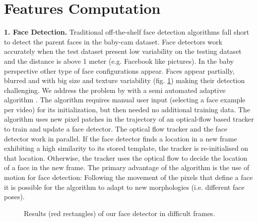 \documentclass[10pt,letterpaper]{article}
\begin{document}
\section{Features Computation}
{\bf 1. Face Detection.} Traditional off-the-shelf face detection algorithms fall short to detect the parent faces in the baby-cam dataset. Face detectors work accurately when the test dataset present low variability on the testing dataset and the distance is above 1 meter (e.g. Facebook like pictures). In the baby perspective other type of face configurations appear. Faces appear partially, blurred and with big size and texture variability (fig. \ref{fig:faces}) making their detection challenging. We address the problem by with a semi automated adaptive algorithm \cite{kalal}. The algorithm requires manual user input (selecting a face example per video) for its initialization, but then needed no additional training data. The algorithm uses new pixel patches in the trajectory of an optical-flow based tracker to train and update a face detector. The optical flow tracker and the face detector work in parallel. If the face detector finds a location in a new frame exhibiting a high similarity to its stored template, the tracker is re-initialised on that location. Otherwise, the tracker uses the optical flow to decide the location of a face in the new frame. The primary advantage of the algorithm is the use of motion for face detection: Following the movement of the pixels that define a face it is possible for the algorithm to adapt to new morphologies (i.e. different face poses).
\begin{figure}[h]
    
    \caption{Results (red rectangles) of our face detector in difficult frames.
 }
\label{fig:faces}
\end{figure}
\end{document}
